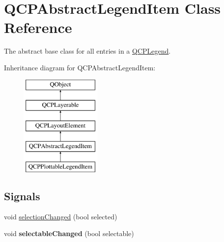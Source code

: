 \hypertarget{class_q_c_p_abstract_legend_item}{}\section{Q\+C\+P\+Abstract\+Legend\+Item Class Reference}
\label{class_q_c_p_abstract_legend_item}


The abstract base class for all entries in a \hyperlink{class_q_c_p_legend}{Q\+C\+P\+Legend}.  


Inheritance diagram for Q\+C\+P\+Abstract\+Legend\+Item\+:\begin{figure}[H]
\begin{center}
\leavevmode
\includegraphics[height=5.000000cm]{class_q_c_p_abstract_legend_item}
\end{center}
\end{figure}
\subsection*{Signals}
\begin{DoxyCompactItemize}
\item 
void \hyperlink{class_q_c_p_abstract_legend_item_a7cb61fdfbaf69c590bacb8f9e7099d9e}{selection\+Changed} (bool selected)
\item 
\hypertarget{class_q_c_p_abstract_legend_item_abc4d779b938cc9235f9196737dbaa6bd}{}\label{class_q_c_p_abstract_legend_item_abc4d779b938cc9235f9196737dbaa6bd} 
void {\bfseries selectable\+Changed} (bool selectable)
\end{DoxyCompactItemize}
